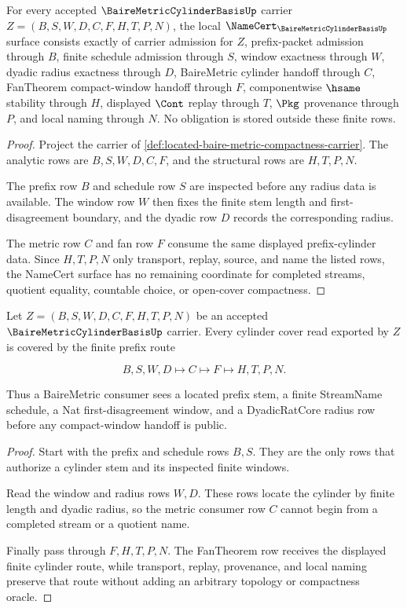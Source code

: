 \begin{theorem}
\label{thm:bairemetric-cylinder-basis-namecert-obligations}
For every accepted $\BaireMetricCylinderBasisUp$ carrier $Z=(B,S,W,D,C,F,H,T,P,N)$, the local $\NameCert_{\BaireMetricCylinderBasisUp}$ surface consists exactly of carrier admission for $Z$, prefix-packet admission through $B$, finite schedule admission through $S$, window exactness through $W$, dyadic radius exactness through $D$, BaireMetric cylinder handoff through $C$, FanTheorem compact-window handoff through $F$, componentwise $\hsame$ stability through $H$, displayed $\Cont$ replay through $T$, $\Pkg$ provenance through $P$, and local naming through $N$. No obligation is stored outside these finite rows.
\end{theorem}
\begin{proof}
Project the carrier of \autoref{def:located-baire-metric-compactness-carrier}. The analytic rows are $B,S,W,D,C,F$, and the structural rows are $H,T,P,N$.

The prefix row $B$ and schedule row $S$ are inspected before any radius data is available. The window row $W$ then fixes the finite stem length and first-disagreement boundary, and the dyadic row $D$ records the corresponding radius.

The metric row $C$ and fan row $F$ consume the same displayed prefix-cylinder data. Since $H,T,P,N$ only transport, replay, source, and name the listed rows, the NameCert surface has no remaining coordinate for completed streams, quotient equality, countable choice, or open-cover compactness.
\end{proof}

\begin{theorem}
\label{thm:bairemetric-cylinder-basis-prefix-cover}
Let $Z=(B,S,W,D,C,F,H,T,P,N)$ be an accepted $\BaireMetricCylinderBasisUp$ carrier. Every cylinder cover read exported by $Z$ is covered by the finite prefix route

$$
B,S,W,D \longmapsto C \longmapsto F \longmapsto H,T,P,N .
$$

Thus a BaireMetric consumer sees a located prefix stem, a finite StreamName schedule, a Nat first-disagreement window, and a DyadicRatCore radius row before any compact-window handoff is public.
\end{theorem}
\begin{proof}
Start with the prefix and schedule rows $B,S$. They are the only rows that authorize a cylinder stem and its inspected finite windows.

Read the window and radius rows $W,D$. These rows locate the cylinder by finite length and dyadic radius, so the metric consumer row $C$ cannot begin from a completed stream or a quotient name.

Finally pass through $F,H,T,P,N$. The FanTheorem row receives the displayed finite cylinder route, while transport, replay, provenance, and local naming preserve that route without adding an arbitrary topology or compactness oracle.
\end{proof}

